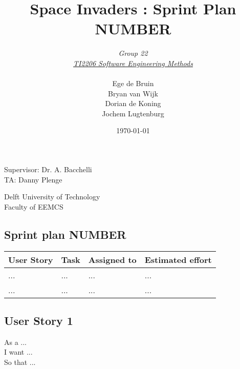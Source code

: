 \documentclass[10pt]{article}
\begin{document}
\title{Space Invaders : Sprint Plan NUMBER}
\date{\today}
\author{\textit{Group 22}\\ \textit{\underline{TI2206 Software Engineering Methods}} \\
 \\Ege de Bruin \\ Bryan van Wijk \\ Dorian de Koning \\ Jochem Lugtenburg }
 \maketitle  
 \begin{center}
Supervisor: Dr. A. Bacchelli\\
TA: Danny Plenge\\
 \end{center}     
 \begin{center}
 Delft University of Technology\\
 Faculty of EEMCS\\
 \end{center}
 \thispagestyle{empty}
 \pagebreak
 
\begin{center}

\section*{Sprint plan NUMBER}

    \begin{tabular}{ | p{2cm} | p{9cm} | p{2.1cm} | p{2cm} |}
    \hline
    User Story & Task & Assigned to & Estimated effort \\ \hline
    ... & ... & ... & ... \\ 
    ... & ... & ... & ... \\ \hline    
    \end{tabular}
    
\end{center}

\subsection*{User Story 1}
As a ...\\ 
\indent I want ...\\
So that ...
\end{document}
